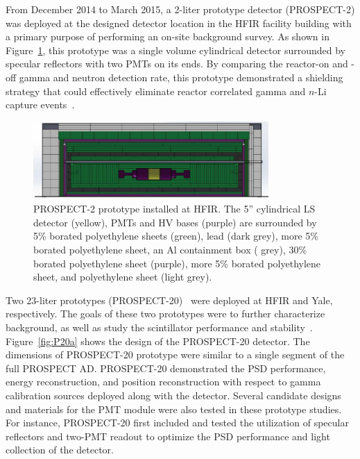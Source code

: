 From December 2014 to March 2015, a 2-liter prototype detector (PROSPECT-2) was deployed at the designed detector location in the HFIR facility building with a primary purpose of performing an on-site background survey.
As shown in Figure~\ref{fig:P2b}, this prototype was a single volume cylindrical detector surrounded by specular reflectors with two PMTs on its ends. 
By comparing the reactor-on and -off gamma and neutron detection rate, this prototype demonstrated a shielding strategy that could effectively eliminate reactor correlated gamma and $n$-Li capture events~\cite{bib:prospect_background}.

\begin{figure}[h!]
    \centering
    \includegraphics[width=0.8\textwidth]{Figures/P2B_Shield.pdf}
    \caption[A schematic of the 2-liter prototype with shielding]{PROSPECT-2 prototype installed at HFIR. 
    The 5” cylindrical LS detector (yellow), PMTs and HV bases (purple) are surrounded by 5\% borated polyethylene sheets (green), lead (dark grey), more 5\% borated polyethylene sheet, an Al containment box ( grey), 30\% borated
polyethylene sheet (purple), more 5\% borated polyethylene sheet, and polyethylene sheet (light grey).}
    \label{fig:P2b}
\end{figure}

Two 23-liter prototypes (PROSPECT-20)~\cite{bib:P20} were deployed at HFIR and Yale, respectively.
The goals of these two prototypes were to further characterize background, as well as study the scintillator performance and stability~\cite{bib:P20}.
Figure~\ref{fig:P20a} shows the design of the PROSPECT-20 detector. 
The dimensions of PROSPECT-20 prototype were similar to a single segment of the full PROSPECT AD.
PROSPECT-20 demonstrated the PSD performance, energy reconstruction, and position reconstruction with respect to gamma calibration sources deployed along with the detector.
Several candidate designs and materials for the PMT module were also tested in these prototype studies.
For instance, PROSPECT-20 first included and tested the utilization of specular reflectors and two-PMT readout to optimize the PSD performance and light collection of the detector.

